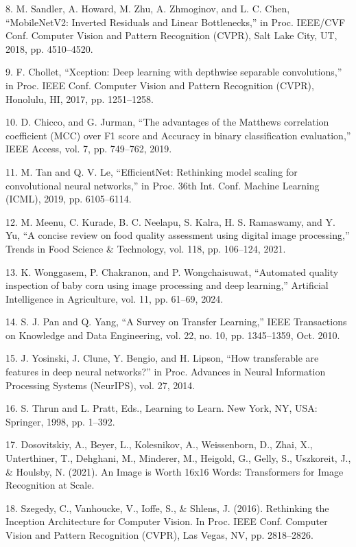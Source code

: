 \documentclass[
]{article}
\begin{document}
8. M. Sandler, A. Howard, M. Zhu, A. Zhmoginov, and L. C. Chen,
``MobileNetV2: Inverted Residuals and Linear Bottlenecks,'' in Proc.
IEEE/CVF Conf. Computer Vision and Pattern Recognition (CVPR), Salt Lake
City, UT, 2018, pp. 4510--4520.

9. F. Chollet, ``Xception: Deep learning with depthwise separable
convolutions,'' in Proc. IEEE Conf. Computer Vision and Pattern
Recognition (CVPR), Honolulu, HI, 2017, pp. 1251--1258.

10. D. Chicco, and G. Jurman, ``The advantages of the Matthews
correlation coefficient (MCC) over F1 score and Accuracy in binary
classification evaluation,'' IEEE Access, vol. 7, pp. 749--762, 2019.

11. M. Tan and Q. V. Le, ``EfficientNet: Rethinking model scaling for
convolutional neural networks,'' in Proc. 36th Int. Conf. Machine
Learning (ICML), 2019, pp. 6105--6114.

12. M. Meenu, C. Kurade, B. C. Neelapu, S. Kalra, H. S. Ramaswamy, and
Y. Yu, ``A concise review on food quality assessment using digital image
processing,'' Trends in Food Science \& Technology, vol. 118, pp.
106--124, 2021.

13. K. Wonggasem, P. Chakranon, and P. Wongchaisuwat, ``Automated quality
inspection of baby corn using image processing and deep learning,''
Artificial Intelligence in Agriculture, vol. 11, pp. 61--69, 2024.

14. S. J. Pan and Q. Yang, ``A Survey on Transfer Learning,'' IEEE
Transactions on Knowledge and Data Engineering, vol. 22, no. 10, pp.
1345--1359, Oct. 2010.

15. J. Yosinski, J. Clune, Y. Bengio, and H. Lipson, ``How transferable
are features in deep neural networks?'' in Proc. Advances in Neural
Information Processing Systems (NeurIPS), vol. 27, 2014.

16. S. Thrun and L. Pratt, Eds., Learning to Learn. New York, NY, USA:
Springer, 1998, pp. 1--392.

17. Dosovitskiy, A., Beyer, L., Kolesnikov, A., Weissenborn, D., Zhai,
X., Unterthiner, T., Dehghani, M., Minderer, M., Heigold, G., Gelly, S.,
Uszkoreit, J., \& Houlsby, N. (2021). An Image is Worth 16x16 Words:
Transformers for Image Recognition at Scale.

18. Szegedy, C., Vanhoucke, V., Ioffe, S., \& Shlens, J. (2016).
Rethinking the Inception Architecture for Computer Vision. In Proc. IEEE
Conf. Computer Vision and Pattern Recognition (CVPR), Las Vegas, NV, pp.
2818--2826.
\end{document}
